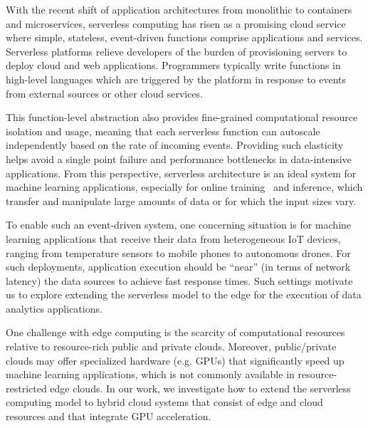 With the recent shift of application architectures from monolithic to containers and microservices, serverless computing has risen as a promising cloud service where simple, stateless, 
event-driven functions comprise applications and services. 
Serverless platforms relieve
developers of the burden of provisioning servers to deploy 
cloud and web applications.
Programmers typically write functions in high-level languages which are triggered by the platform in response to events from external sources or other cloud services. 

This function-level abstraction also provides fine-grained computational resource isolation and usage, meaning that each serverless function can autoscale independently based on the rate of incoming events. Providing such elasticity helps avoid a single point failure and performance bottlenecks in data-intensive applications. From this perspective, serverless architecture is an ideal system for machine learning applications, especially for online training~\cite{ref:online} and inference, which transfer and manipulate large amounts of data or for 
which the input sizes vary.

To enable such an event-driven system, one concerning situation is for machine learning applications that receive their data from  heterogeneous IoT devices, ranging from temperature sensors to mobile phones to autonomous drones. For such deployments, application execution should be ``near'' (in terms of network latency) the data sources to achieve fast response times. Such settings motivate us to explore extending the serverless model to the edge for the execution of data analytics applications.

One challenge with edge computing is the scarcity of computational resources relative to resource-rich public and private clouds. Moreover, public/private clouds may offer specialized hardware (e.g. GPUs) that significantly speed up machine learning applications, which is not commonly available in resource-restricted edge clouds.
In our work, we investigate how to extend the serverless computing model to hybrid cloud systems that consist of edge and cloud resources and that integrate GPU acceleration. 

